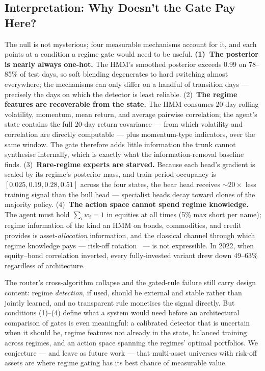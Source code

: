 \documentclass[sigconf,anonymous,review]{acmart}
\begin{document}
\subsection{Interpretation: Why Doesn't the Gate Pay Here?}
\label{sec:interpretation}
The null is not mysterious; four measurable mechanisms account for it,
and each points at a condition a regime gate would need to be useful.
\textbf{(1)~The posterior is nearly always one-hot.} The HMM's
smoothed posterior exceeds 0.99 on 78--85\% of test days, so soft
blending degenerates to hard switching almost everywhere; the
mechanisms can only differ on a handful of transition days ---
precisely the days on which the detector is least reliable. (2)~\textbf{The
regime features are recoverable from the state.} The HMM consumes
20-day rolling volatility, momentum, mean return, and average pairwise
correlation; the agent's state contains the full 20-day return
covariance --- from which volatility and correlation are directly
computable --- plus momentum-type indicators, over the same window. The
gate therefore adds little information the trunk cannot synthesise
internally, which is exactly what the information-removal baseline
finds. (3)~\textbf{Rare-regime experts are starved.} Because each
head's gradient is scaled by its regime's posterior mass, and
train-period occupancy is $[0.025, 0.19, 0.28, 0.51]$ across the four
states, the bear head receives ${\sim}20\times$ less training signal
than the bull head --- specialist heads decay toward clones of the
majority policy. (4)~\textbf{The action space cannot spend regime
knowledge.} The agent must hold $\sum_i w_i = 1$ in equities at all
times (5\% max short per name); regime information of the kind an HMM
on bonds, commodities, and credit provides is asset-\emph{allocation}
information, and the classical channel through which regime knowledge
pays --- risk-off rotation~\cite{ang2002regimes} --- is not expressible.
In 2022, when equity--bond correlation inverted, every fully-invested
variant drew down 49--63\% regardless of architecture.

The router's cross-algorithm collapse and the gated-rule failure still
carry design content: regime \emph{detection}, if used, should be
external and stable rather than jointly learned, and no transparent
rule monetises the signal directly. But conditions (1)--(4) define what
a system would need before an architectural comparison of gates is even
meaningful: a calibrated detector that is uncertain when it should be,
regime features not already in the state, balanced training across
regimes, and an action space spanning the regimes' optimal portfolios.
We conjecture --- and leave as future work --- that multi-asset
universes with risk-off assets are where regime gating has its best
chance of measurable value.
\end{document}
